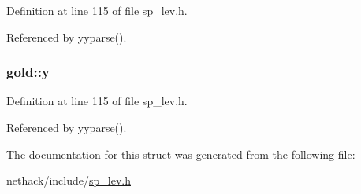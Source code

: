 Definition at line 115 of file sp\+\_\+lev.\+h.



Referenced by yyparse().

\hypertarget{structgold_a1fe44e270a7b537b490afa2151efd436}{
\subsubsection[{y}]{ gold\+::y}}\label{structgold_a1fe44e270a7b537b490afa2151efd436}


Definition at line 115 of file sp\+\_\+lev.\+h.



Referenced by yyparse().



The documentation for this struct was generated from the following file\+:\begin{DoxyCompactItemize}
\item 
nethack/include/\hyperlink{sp__lev_8h}{sp\+\_\+lev.\+h}\end{DoxyCompactItemize}
